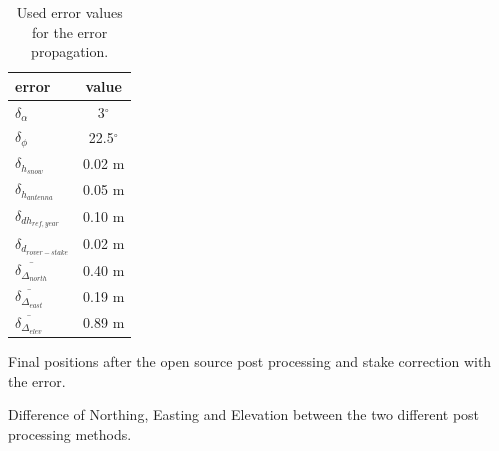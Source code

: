 \begin{table}[h]
	\caption{Used error values for the error propagation.}
	\centering
	\begin{tabular}{lc}
	\toprule
        error &  value \\
	\midrule
    $ \delta_{\alpha} $ &  3$^{\circ}$ \\
    $ \delta_{\phi} $ &  22.5$^{\circ}$ \\
    $ \delta_{h_{snow}}$ &  0.02 m \\
    $ \delta_{h_{antenna}} $ &  0.05 m \\
    $ \delta_{dh_{ref,year}} $ &  0.10 m \\
    $ \delta_{d_{rover-stake}} $ &  0.02 m \\
    $ \overline{\delta_{\Delta_{north}}} $ & 0.40 m \\
    $ \overline{\delta_{\Delta_{east}}} $ & 0.19 m \\
    $ \overline{\delta_{\Delta_{elev}}} $ & 0.89 m \\
    \bottomrule
\end{tabular}
	\label{GPS:tab:err}
\end{table}

\begin{table}[h]
	\caption{Final positions after the open source post processing and stake correction with the error.}
	\centering
	\scriptsize
	
	\label{GPS:tab:os_tab}
\end{table}


\begin{table}[h]
	\caption{Difference of Northing, Easting and Elevation between the two different post processing methods.}
	\centering
	
	\label{GPS:tab:diff_tab}
\end{table}
